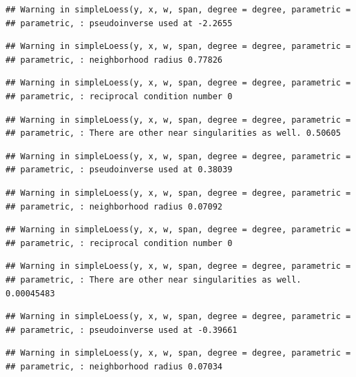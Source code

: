 \documentclass[]{article}
\begin{document}
\begin{verbatim}
## Warning in simpleLoess(y, x, w, span, degree = degree, parametric =
## parametric, : pseudoinverse used at -2.2655
\end{verbatim}

\begin{verbatim}
## Warning in simpleLoess(y, x, w, span, degree = degree, parametric =
## parametric, : neighborhood radius 0.77826
\end{verbatim}

\begin{verbatim}
## Warning in simpleLoess(y, x, w, span, degree = degree, parametric =
## parametric, : reciprocal condition number 0
\end{verbatim}

\begin{verbatim}
## Warning in simpleLoess(y, x, w, span, degree = degree, parametric =
## parametric, : There are other near singularities as well. 0.50605
\end{verbatim}

\begin{verbatim}
## Warning in simpleLoess(y, x, w, span, degree = degree, parametric =
## parametric, : pseudoinverse used at 0.38039
\end{verbatim}

\begin{verbatim}
## Warning in simpleLoess(y, x, w, span, degree = degree, parametric =
## parametric, : neighborhood radius 0.07092
\end{verbatim}

\begin{verbatim}
## Warning in simpleLoess(y, x, w, span, degree = degree, parametric =
## parametric, : reciprocal condition number 0
\end{verbatim}

\begin{verbatim}
## Warning in simpleLoess(y, x, w, span, degree = degree, parametric =
## parametric, : There are other near singularities as well. 0.00045483
\end{verbatim}

\begin{verbatim}
## Warning in simpleLoess(y, x, w, span, degree = degree, parametric =
## parametric, : pseudoinverse used at -0.39661
\end{verbatim}

\begin{verbatim}
## Warning in simpleLoess(y, x, w, span, degree = degree, parametric =
## parametric, : neighborhood radius 0.07034
\end{verbatim}
\end{document}
